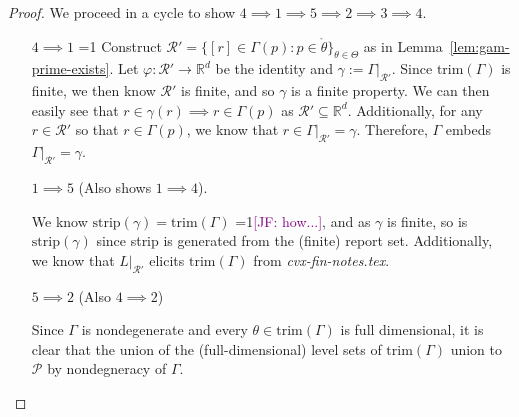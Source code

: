 \documentclass[12pt]{article}
\newcommand{\Comments}{1}
\newcommand{\mynote}[2]{\ifnum\Comments=1\textcolor{#1}{#2}\fi}
\newcommand{\mytodo}[2]{\ifnum\Comments=1%
  \todo[linecolor=#1!80!black,backgroundcolor=#1,bordercolor=#1!80!black]{#2}\fi}
\newcommand{\jessie}[1]{\mynote{purple}{[JF: #1]}}
\newcommand{\jessiet}[1]{\mytodo{purple!20!white}{JF: #1}}
\newcommand{\reals}{\mathbb{R}}
\renewcommand{\P}{\mathcal{P}}
\newcommand{\R}{\mathcal{R}}
\newcommand{\inter}[1]{\mathring{#1}}%
\newcommand{\trim}{\mathrm{trim}}
\newcommand{\strip}{\mathrm{strip}}
\begin{document}
\begin{proof}
We proceed in a cycle to show $4 \implies 1 \implies 5 \implies 2 \implies 3 \implies 4$.

\begin{enumerate}


\item[$4 \implies 1$] \jessiet{Cut}
Construct $\R' = \{ [r] \in \Gamma(p): p \in \inter{\theta} \}_{\theta\in\Theta}$ as in Lemma~\ref{lem:gam-prime-exists}.
Let $\varphi : \R' \to \reals^d$ be the identity and $\gamma := \Gamma|_{\R'}$.
Since $\trim(\Gamma)$ is finite, we then know $\R'$ is finite, and so $\gamma$ is a finite property.
We can then easily see that $r \in \gamma(r) \implies r \in \Gamma(p)$ as $\R' \subseteq \reals^d$.
Additionally, for any $r \in \R'$ so that $r \in \Gamma(p)$, we know that $r \in \Gamma|_{\R'} = \gamma$.
Therefore, $\Gamma$ embeds $\Gamma|_{\R'} = \gamma$.




\item [$1 \implies 5$]
(Also shows $1 \implies 4$).

We know $\strip(\gamma) = \trim(\Gamma)$ \jessie{how...}, and as $\gamma$ is finite, so is $\strip(\gamma)$ since strip is generated from the (finite) report set.
Additionally, we know that $L|_{\R'}$ elicits $\trim(\Gamma)$ from \emph{cvx-fin-notes.tex}.

\item [$5 \implies 2$]
(Also $4 \implies 2$)

Since $\Gamma$ is nondegenerate and every $\theta \in \trim(\Gamma)$ is full dimensional, it is clear that the union of the (full-dimensional) level sets of $\trim(\Gamma)$ union to $\P$ by nondegneracy of $\Gamma$.



\end{enumerate}
\end{proof}
\end{document}
